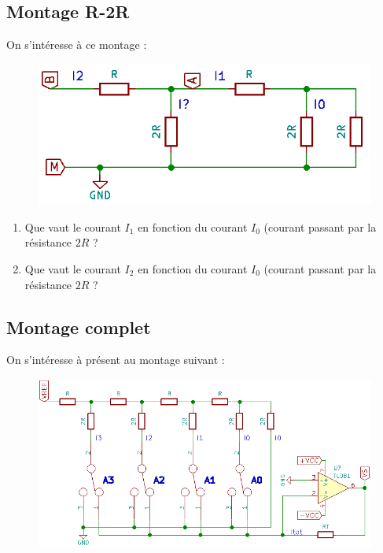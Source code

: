 \subsection*{Montage R-2R}

On s'intéresse à ce montage :

\begin{figure}[!h]
	\centering
	\includegraphics{images/TD/convAN_R2R_a.png}
\end{figure}


\begin{enumerate}
	\item Que vaut le courant $I_1$ en fonction du courant $I_0$ (courant passant par la résistance $2R$ ?
	\item Que vaut le courant $I_2$ en fonction du courant $I_0$ (courant passant par la résistance $2R$ ?	
\end{enumerate}

\subsection*{Montage complet}

On s'intéresse à présent au montage suivant : 

\begin{figure}[!h]
	\centering
	\includegraphics{images/TD/convAN_R2R_b.png}
\end{figure}

